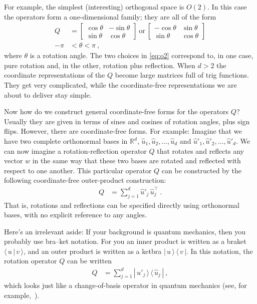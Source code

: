 \documentclass{article}
\newcommand{\braket}[2]{\langle\,{#1}\,|\,{#2}\,\rangle}
\newcommand{\ketbra}[2]{|\,{#1}\,\rangle\,\langle\,{#2}\,|}
\begin{document}
For example, the simplest (interesting) orthogonal space is $O(2)$. In this case the operators form a one-dimensional family; they are all of the form
\begin{align}
    Q &= \begin{bmatrix}\cos{\theta} & -\sin{\theta} \\ \sin{\theta} & \cos{\theta}\end{bmatrix} ~\mbox{or}~
    \begin{bmatrix}-\cos{\theta} & \sin{\theta} \\ \sin{\theta} & \cos{\theta}\end{bmatrix} \label{eq:o2}
    \\
    -\pi &< \theta < \pi ~,
\end{align}
where $\theta$ is a rotation angle.
The two choices in \eqref{eq:o2} correspond to, in one case, pure rotation and, in the other, rotation plus reflection.
When $d>2$ the coordinate representations of the $Q$ become large matrices full of trig functions.
They get very complicated, while the coordinate-free representations we are about to deliver stay simple.

Now how do we construct general coordinate-free forms for the operators $Q$?
Usually they are given in terms of sines and cosines of rotation angles, plus sign flips.
However, there are coordinate-free forms.
For example: Imagine that we have two complete orthonormal bases in $\mathbb{R}^d$, $\hat{u}_1,\hat{u}_2,\ldots,\hat{u}_d$ and $\hat{u}'_1,\hat{u}'_2,\ldots,\hat{u}'_d$.
We can now imagine a rotation-reflection operator $Q$ that rotates and reflects any vector $w$ in the same way that these two bases are rotated and reflected with respect to one another.
This particular operator $Q$ can be constructed by the following coordinate-free outer-product construction:
\begin{align}
    Q &= \sum_{j=1}^d \hat{u}'_j\,\hat{u}_j^\top ~.
\end{align}
That is, rotations and reflections can be specified directly using orthonormal bases, with no explicit reference to any angles.

Here's an irrelevant aside:
If your background is quantum mechanics, then you probably use bra--ket notation.
For you an inner product is written as a braket $\braket{u}{v}$, and an outer product is written as a ketbra $\ketbra{u}{v}$.
In this notation, the rotation operator $Q$ can be written 
\begin{align}
    Q &= \sum_{j=1}^d \ketbra{\hat{u}'_j}{\hat{u}_j} ~,
\end{align}
which looks just like a change-of-basis operator in quantum mechanics (see, for example,~\cite{}).
\end{document}
